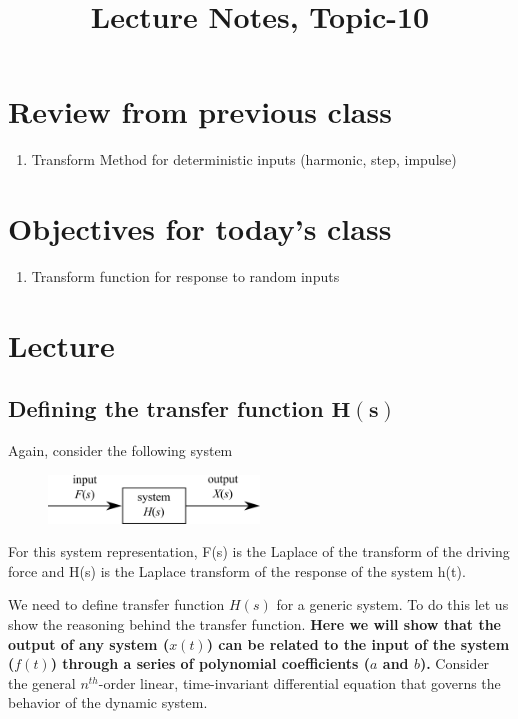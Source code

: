 \documentclass[12pt,a4paper]{article}
\begin{document}
	
	\large{}
	\title{\vspace{-2cm}Lecture Notes, Topic-10}
	\date{}
	\maketitle
	
	\section*{Review from previous class}
		\begin{enumerate}
			\item Transform Method for deterministic inputs (harmonic, step, impulse)
		\end{enumerate}
	
	\section*{Objectives for today's class}
	\begin{enumerate}
		\item Transform function for response to random inputs
	\end{enumerate}
	
	\section*{Lecture}

\subsection*{Defining the transfer function $\mathbf{H(s)}$}

Again, consider the following system
\begin{figure}[H]
	\centering
	\includegraphics[width=0.5\textwidth]{../../Figures/system_input_output.png}
\end{figure}
For this system representation, F(s) is the Laplace of the transform of the driving force and H(s) is the Laplace transform of the response of the system h(t). 

We need to define transfer function $H(s)$ for a generic system. To do this let us show the reasoning behind the transfer function. \textbf{Here we will show that the output of any system ($x(t)$) can be related to the input of the system ($f(t)$) through a series of polynomial coefficients ($a$ and $b$).} Consider the general $n^{th}$-order linear, time-invariant differential equation that governs the behavior of the dynamic system.
\end{document}
